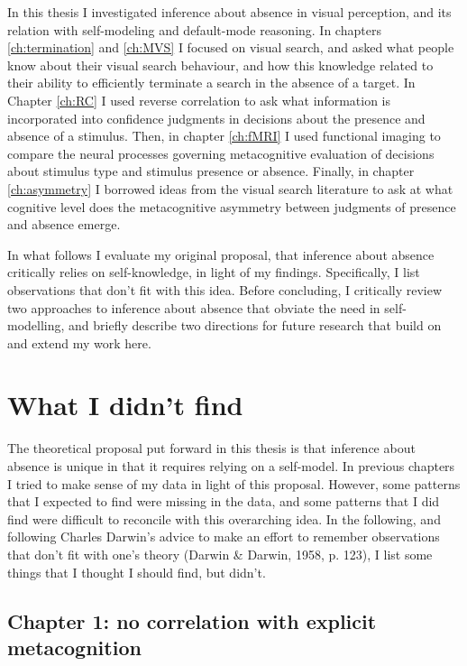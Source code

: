 \documentclass[12pt,twoside]{reedthesis}
\begin{document}
In this thesis I investigated inference about absence in visual perception, and its relation with self-modeling and default-mode reasoning. In chapters \ref{ch:termination} and \ref{ch:MVS} I focused on visual search, and asked what people know about their visual search behaviour, and how this knowledge related to their ability to efficiently terminate a search in the absence of a target. In Chapter \ref{ch:RC} I used reverse correlation to ask what information is incorporated into confidence judgments in decisions about the presence and absence of a stimulus. Then, in chapter \ref{ch:fMRI} I used functional imaging to compare the neural processes governing metacognitive evaluation of decisions about stimulus type and stimulus presence or absence. Finally, in chapter \ref{ch:asymmetry} I borrowed ideas from the visual search literature to ask at what cognitive level does the metacognitive asymmetry between judgments of presence and absence emerge.

In what follows I evaluate my original proposal, that inference about absence critically relies on self-knowledge, in light of my findings. Specifically, I list observations that don't fit with this idea. Before concluding, I critically review two approaches to inference about absence that obviate the need in self-modelling, and briefly describe two directions for future research that build on and extend my work here.

\hypertarget{didnotfind}{%
\section*{What I didn't find}\label{didnotfind}}

The theoretical proposal put forward in this thesis is that inference about absence is unique in that it requires relying on a self-model. In previous chapters I tried to make sense of my data in light of this proposal. However, some patterns that I expected to find were missing in the data, and some patterns that I did find were difficult to reconcile with this overarching idea. In the following, and following Charles Darwin's advice to make an effort to remember observations that don't fit with one's theory (Darwin \& Darwin, 1958, p. 123), I list some things that I thought I should find, but didn't.

\hypertarget{chapter-1-no-correlation-with-explicit-metacognition}{%
\subsection*{Chapter 1: no correlation with explicit metacognition}\label{chapter-1-no-correlation-with-explicit-metacognition}}
\end{document}
